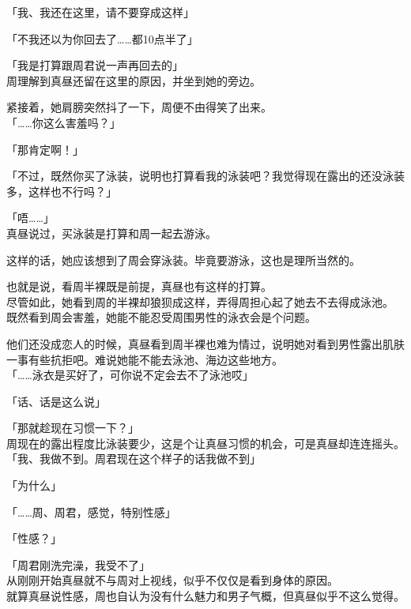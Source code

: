 「我、我还在这里，请不要穿成这样」

「不我还以为你回去了……都10点半了」

「我是打算跟周君说一声再回去的」\\

周理解到真昼还留在这里的原因，并坐到她的旁边。

紧接着，她肩膀突然抖了一下，周便不由得笑了出来。\\

「……你这么害羞吗？」

「那肯定啊！」

「不过，既然你买了泳装，说明也打算看我的泳装吧？我觉得现在露出的还没泳装多，这样也不行吗？」

「唔……」\\

真昼说过，买泳装是打算和周一起去游泳。

这样的话，她应该想到了周会穿泳装。毕竟要游泳，这也是理所当然的。

也就是说，看周半裸既是前提，真昼也有这样的打算。\\

尽管如此，她看到周的半裸却狼狈成这样，弄得周担心起了她去不去得成泳池。\\

既然看到周会害羞，她能不能忍受周围男性的泳衣会是个问题。

他们还没成恋人的时候，真昼看到周半裸也难为情过，说明她对看到男性露出肌肤一事有些抗拒吧。难说她能不能去泳池、海边这些地方。\\

「……泳衣是买好了，可你说不定会去不了泳池哎」

「话、话是这么说」

「那就趁现在习惯一下？」\\

周现在的露出程度比泳装要少，这是个让真昼习惯的机会，可是真昼却连连摇头。\\

「我、我做不到。周君现在这个样子的话我做不到」

「为什么」

「……周、周君，感觉，特别性感」

「性感？」

「周君刚洗完澡，我受不了」\\

从刚刚开始真昼就不与周对上视线，似乎不仅仅是看到身体的原因。\\

就算真昼说性感，周也自认为没有什么魅力和男子气概，但真昼似乎不这么觉得。

